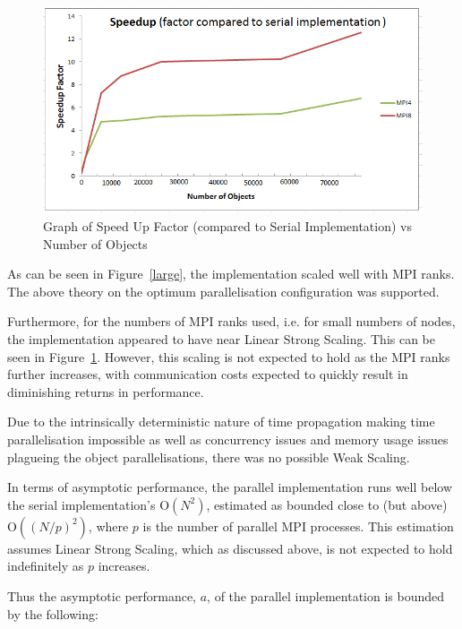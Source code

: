 \documentclass[twoside,twocolumn]{article}
\begin{document}
	\begin{figure}
		\caption{Graph of Speed Up Factor (compared to Serial Implementation) vs Number of Objects}
		\label{speed}
		\includegraphics[scale=.8]{speed.png}
	\end{figure}
	
	As can be seen in Figure~\ref{large}, the implementation scaled well with MPI ranks. The above theory on the optimum parallelisation configuration was supported. \newline
	
	Furthermore, for the numbers of MPI ranks used, i.e. for small numbers of nodes, the implementation appeared to have near Linear Strong Scaling. This can be seen in Figure~\ref{speed}. However, this scaling is not expected to hold as the MPI ranks further increases, with communication costs expected to quickly result in diminishing returns in performance. \newline
	
	Due to the intrinsically deterministic nature of time propagation making time parallelisation impossible as well as concurrency issues and memory usage issues plagueing the object parallelisations, there was no possible Weak Scaling. \newline
	
	In terms of asymptotic performance, the parallel implementation runs well below the serial implementation's O$(N^2)$, estimated as bounded close to (but above) O$((N/p)^2)$, where $p$ is the number of parallel MPI processes. This estimation assumes Linear Strong Scaling, which as discussed above, is not expected to hold indefinitely as $p$ increases. \newline
	
	Thus the asymptotic performance, $a$, of the parallel implementation is bounded by the following: \newline
	
\end{document}
